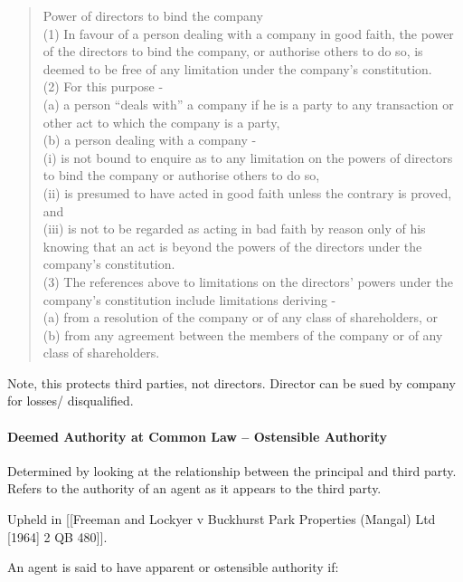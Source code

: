 \documentclass[
]{article}
\begin{document}
\begin{quote}
Power of directors to bind the company\\
(1) In favour of a person dealing with a company in good faith, the
power of the directors to bind the company, or authorise others to do
so, is deemed to be free of any limitation under the company's
constitution.\\
(2) For this purpose -\\
(a) a person ``deals with'' a company if he is a party to any
transaction or other act to which the company is a party,\\
(b) a person dealing with a company -\\
(i) is not bound to enquire as to any limitation on the powers of
directors to bind the company or authorise others to do so,\\
(ii) is presumed to have acted in good faith unless the contrary is
proved, and\\
(iii) is not to be regarded as acting in bad faith by reason only of his
knowing that an act is beyond the powers of the directors under the
company's constitution.\\
(3) The references above to limitations on the directors' powers under
the company's constitution include limitations deriving -\\
(a) from a resolution of the company or of any class of shareholders,
or\\
(b) from any agreement between the members of the company or of any
class of shareholders.
\end{quote}

Note, this protects third parties, not directors. Director can be sued
by company for losses/ disqualified.

\hypertarget{deemed-authority-at-common-law-ostensible-authority}{%
\paragraph{Deemed Authority at Common Law -- Ostensible
Authority}\label{deemed-authority-at-common-law-ostensible-authority}}

Determined by looking at the relationship between the principal and
third party. Refers to the authority of an agent as it appears to the
third party.

Upheld in {[}{[}Freeman and Lockyer v Buckhurst Park Properties (Mangal)
Ltd {[}1964{]} 2 QB 480{]}{]}.

An agent is said to have apparent or ostensible authority if:
\end{document}
